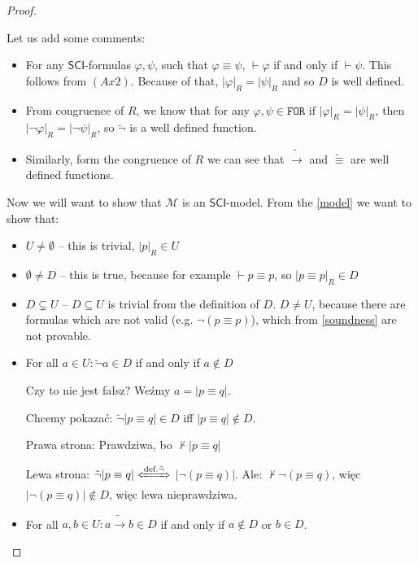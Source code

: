 \documentclass{article}
\theoremstyle{definition}
\theoremstyle{definition}
\theoremstyle{definition}
\newcommand*{\id}{\equiv}
\newcommand*{\ra}{\rightarrow}
\newcommand*{\FOR}{\texttt{FOR}}
\newcommand{\SCI}{$\mathsf{SCI}$\xspace}
\begin{document}
\begin{proof}
\begin{itemize}
    \end{itemize}
    Let us add some comments:
    \begin{itemize}
        \item For any \SCI-formulas $\varphi, \psi$, such that $\varphi \id \psi$, $\vdash
                  \varphi$ if and only if $\vdash \psi$. This follows from $(Ax2)$. Because of
              that, $|\varphi|_R = |\psi|_R$ and so $D$ is well defined.
        \item From congruence of $R$, we know that for any $\varphi, \psi \in \FOR$ if
              $|\varphi|_R = |\psi|_R$, then $|\lnot \varphi|_R = |\lnot \psi|_R$, so
              $\tilde{\lnot}$ is a well defined function.
        \item Similarly, form the congruence of $R$ we can see that $\tilde{\ra}$ and
              $\tilde{\id}$ are well defined functions.
    \end{itemize}
    Now we will want to show that $\mathcal{M}$ is an \SCI-model. From the
    \cref{model} we want to show that:
    \begin{itemize}
        \item $U \not = \emptyset$ -- this is trivial, $|p|_R \in U$
        \item $\emptyset \not = D$ -- this is true, because for example $\vdash p \id p$, so $|p \id p|_R \in D$
        \item $D \subsetneq U$ --  $D \subseteq U$ is trivial from the definition of $D$. $D \not = U$, because there are formulas which are not valid (e.g. $\lnot(p \id p)$), which from \cref{soundness} are not provable.
        \item For all $a \in U: \tilde{\lnot} a \in D$ if and only if $a \not \in D$

              {\color{red} Czy to nie jest fałsz? Weźmy $a=|p\id q|$.

                      Chcemy pokazać: $\tilde{\lnot}|p \id q| \in D$ iff $|p \id q| \not \in D$.

                      Prawa strona: Prawdziwa, bo $\not \vdash |p \id q|$

                      Lewa strona: $\tilde{\lnot}|p \id q| \xLeftrightarrow{\text{def.}
                              \tilde{\lnot}}$ $|\lnot(p \id q)|$. Ale: $\not \vdash \lnot(p \id q)$, więc
                      $|\lnot(p \id q)| \not \in D$, więc lewa nieprawdziwa.}
        \item For all $a, b \in U: a \tilde{\ra}b \in D$ if and only if $a \not \in D$ or $b
                  \in D$.


\end{itemize}
\end{proof}
\end{document}
